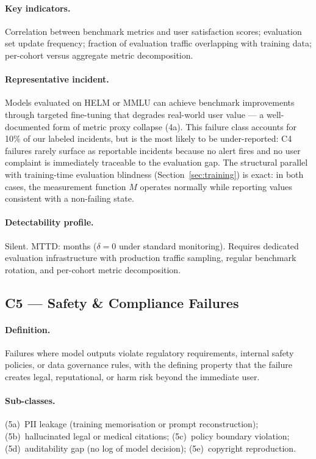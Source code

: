 \documentclass{article}
\begin{document}
\paragraph{Key indicators.}
Correlation between benchmark metrics and user satisfaction scores; evaluation
set update frequency; fraction of evaluation traffic overlapping with training
data; per-cohort versus aggregate metric decomposition.

\paragraph{Representative incident.}
Models evaluated on HELM \citep{liang2022helm} or MMLU can achieve benchmark
improvements through targeted fine-tuning that degrades real-world user value
--- a well-documented form of metric proxy collapse (4a).  This failure class
accounts for 10\% of our labeled incidents, but is the most likely to be
under-reported: C4 failures rarely surface as reportable incidents because
no alert fires and no user complaint is immediately traceable to the evaluation
gap.  The structural parallel with training-time evaluation blindness
(Section~\ref{sec:training}) is exact: in both cases, the measurement function
$M$ operates normally while reporting values consistent with a non-failing state.

\paragraph{Detectability profile.}
Silent.  MTTD: months ($\delta = 0$ under standard monitoring).  Requires
dedicated evaluation infrastructure with production traffic sampling, regular
benchmark rotation, and per-cohort metric decomposition.

\subsection{C5 --- Safety \& Compliance Failures}

\paragraph{Definition.}
Failures where model outputs violate regulatory requirements, internal safety
policies, or data governance rules, with the defining property that the failure
creates legal, reputational, or harm risk beyond the immediate user.

\paragraph{Sub-classes.}
(5a)~PII leakage (training memorisation or prompt reconstruction);
(5b)~hallucinated legal or medical citations; (5c)~policy boundary violation;
(5d)~auditability gap (no log of model decision); (5e)~copyright reproduction.
\end{document}
